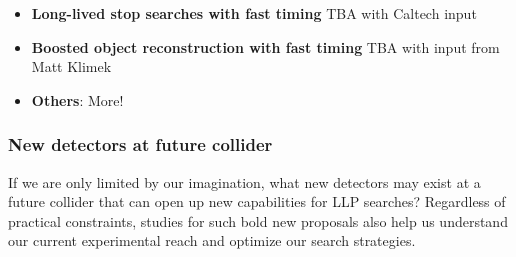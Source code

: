 \begin{itemize}
\item \textbf{Long-lived stop searches with fast timing}
TBA with Caltech input

\item \textbf{Boosted object reconstruction with fast timing}
TBA with input from Matt Klimek

\item \textbf{Others}: More!
\end{itemize}

\subsubsection{New detectors at future collider}

If we are only limited by our imagination, what new detectors may exist at a future collider that can open up new capabilities for LLP searches? Regardless of practical constraints, studies for such bold new proposals also help us understand our current experimental reach and optimize our search strategies.

